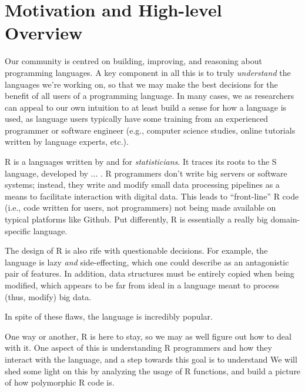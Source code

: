 \documentclass[acmsmall,10pt,review,anonymous]{acmart}\settopmatter{printfolios=true,printccs=false,printacmref=false}
\begin{document}



%
%
%
%
%
%
\section{Motivation and High-level Overview}

Our community is centred on building, improving, and reasoning about programming languages.
A key component in all this is to truly \textit{understand} the languages we're working on, so that we may make the best decisions for the benefit of all users of a programming language.
In many cases, we as researchers can appeal to our own intuition to at least build a sense for how a language is used, as language users typically have some training from an experienced programmer or software engineer (e.g., computer science studies, online tutorials written by language experts, etc.).

R is a languages written by and for \textit{statisticians}.
It traces its roots to the S language, developed by ... .
R programmers don't write big servers or software systems; instead, they write and modify small data processing pipelines as a means to facilitate interaction with digital data.
This leads to ``front-line'' R code (i.e., code written for users, not programmers) not being made available on typical platforms like Github.
Put differently, R is essentially a really big domain-specific language.

The design of R is also rife with questionable decisions.
For example, the language is lazy \textit{and} side-effecting, which one could describe as an antagonistic pair of features.
In addition, data structures must be entirely copied when being modified, which appears to be far from ideal in a language meant to process (thus, modify) big data.

In spite of these flaws, the language is incredibly popular. 

One way or another, R is here to stay, so we may as well figure out how to deal with it.
One aspect of this is understanding R programmers and how they interact with the language, and a step towards this goal is to understand 
We will shed some light on this by analyzing the usage of R functions, and build a picture of how polymorphic R code is.
\end{document}

